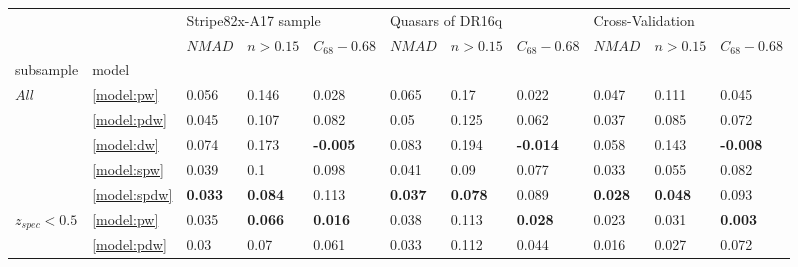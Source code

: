 \documentclass[fleqn,usenatbib]{mnras}
\begin{document}
\begin{table}
	\begin{tabular}{lllllllllll}
            \hline
                              &                  & \multicolumn{3}{l}{Stripe82x-A17 sample} & \multicolumn{3}{l}{Quasars of DR16q} & \multicolumn{3}{l}{Cross-Validation} \\
                              &                  &               $NMAD$ &        $n>0.15$ &  $C_{68} - 0.68$ &           $NMAD$ &        $n>0.15$ &  $C_{68} - 0.68$ &           $NMAD$ &        $n>0.15$ &  $C_{68} - 0.68$ \\
            subsample & model &                      &                 &                  &                  &                 &                  &                  &                 &                  \\
            \hline
\hline
            $All$ & \ref{model:pw} &                0.056 &           0.146 &            0.028 &            0.065 &            0.17 &            0.022 &            0.047 &           0.111 &            0.045 \\
                              & \ref{model:pdw} &                0.045 &           0.107 &            0.082 &             0.05 &           0.125 &            0.062 &            0.037 &           0.085 &            0.072 \\
                              & \ref{model:dw} &                0.074 &           0.173 &  \textbf{-0.005} &            0.083 &           0.194 &  \textbf{-0.014} &            0.058 &           0.143 &  \textbf{-0.008} \\
                              & \ref{model:spw} &                0.039 &             0.1 &            0.098 &            0.041 &            0.09 &            0.077 &            0.033 &           0.055 &            0.082 \\
                              & \ref{model:spdw} &       \textbf{0.033} &  \textbf{0.084} &            0.113 &   \textbf{0.037} &  \textbf{0.078} &            0.089 &   \textbf{0.028} &  \textbf{0.048} &            0.093 \\
\hline
            $z_{spec} < 0.5$ & \ref{model:pw} &                0.035 &  \textbf{0.066} &   \textbf{0.016} &            0.038 &           0.113 &   \textbf{0.028} &            0.023 &           0.031 &   \textbf{0.003} \\
                              & \ref{model:pdw} &                 0.03 &            0.07 &            0.061 &            0.033 &           0.112 &            0.044 &            0.016 &           0.027 &            0.072 \\

\end{tabular}
\end{table}
\end{document}
